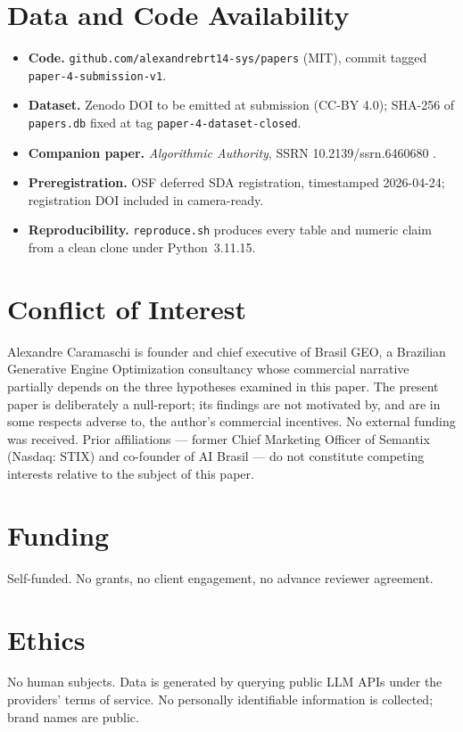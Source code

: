 \documentclass[preprint,12pt,authoryear]{elsarticle}
\begin{document}
\section*{Data and Code Availability}
\begin{itemize}[leftmargin=1.2em]
\item \textbf{Code.} \texttt{github.com/alexandrebrt14-sys/papers} (MIT), commit tagged \texttt{paper-4-submission-v1}.
\item \textbf{Dataset.} Zenodo DOI to be emitted at submission (CC-BY 4.0); SHA-256 of \texttt{papers.db} fixed at tag \texttt{paper-4-dataset-closed}.
\item \textbf{Companion paper.} \textit{Algorithmic Authority}, SSRN 10.2139/ssrn.6460680 \citep{Caramaschi2026}.
\item \textbf{Preregistration.} OSF deferred SDA registration, timestamped 2026-04-24; registration DOI included in camera-ready.
\item \textbf{Reproducibility.} \texttt{reproduce.sh} produces every table and numeric claim from a clean clone under Python~3.11.15.
\end{itemize}

\section*{Conflict of Interest}
Alexandre Caramaschi is founder and chief executive of Brasil GEO, a Brazilian Generative Engine Optimization consultancy whose commercial narrative partially depends on the three hypotheses examined in this paper. The present paper is deliberately a null-report; its findings are not motivated by, and are in some respects adverse to, the author's commercial incentives. No external funding was received. Prior affiliations --- former Chief Marketing Officer of Semantix (Nasdaq: STIX) and co-founder of AI Brasil --- do not constitute competing interests relative to the subject of this paper.

\section*{Funding}
Self-funded. No grants, no client engagement, no advance reviewer agreement.

\section*{Ethics}
No human subjects. Data is generated by querying public LLM APIs under the providers' terms of service. No personally identifiable information is collected; brand names are public.
\end{document}
